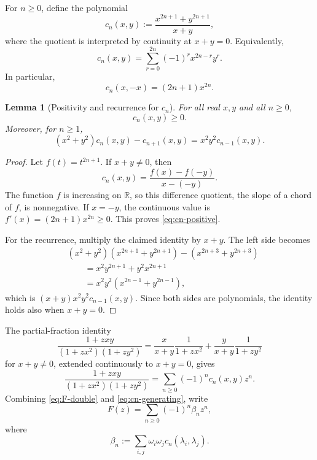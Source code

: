 \documentclass[11pt]{article}
\newtheorem{lemma}[theorem]{Lemma}
\newcommand{\R}{\mathbb{R}}
\begin{document}
For $n\ge0$, define the polynomial
\begin{equation}
  c_n(x,y)
  :=
  \frac{x^{2n+1}+y^{2n+1}}{x+y},
  \label{eq:def-cn-quotient}
\end{equation}
where the quotient is interpreted by continuity at $x+y=0$.  Equivalently,
\begin{equation}
  c_n(x,y)
  =
  \sum_{r=0}^{2n}(-1)^r x^{2n-r}y^r.
  \label{eq:def-cn-polynomial}
\end{equation}
In particular,
\[
  c_n(x,-x)=(2n+1)x^{2n}.
\]

\begin{lemma}[Positivity and recurrence for $c_n$]
\label{lem:cn}
For all real $x,y$ and all $n\ge0$,
\begin{equation}
  c_n(x,y)\ge0.
  \label{eq:cn-positive}
\end{equation}
Moreover, for $n\ge1$,
\begin{equation}
  (x^2+y^2)c_n(x,y)-c_{n+1}(x,y)
  =x^2y^2c_{n-1}(x,y).
  \label{eq:cn-recurrence}
\end{equation}
\end{lemma}

\begin{proof}
Let $f(t)=t^{2n+1}$.  If $x+y\ne0$, then
\[
  c_n(x,y)=\frac{f(x)-f(-y)}{x-(-y)}.
\]
The function $f$ is increasing on $\R$, so this difference quotient,
the slope of a chord of $f$, is nonnegative.  If $x=-y$, the continuous value is
$f'(x)=(2n+1)x^{2n}\ge0$.  This proves
\eqref{eq:cn-positive}.

For the recurrence, multiply the claimed identity by $x+y$.  The left
side becomes
\begin{align*}
 &(x^2+y^2)(x^{2n+1}+y^{2n+1})
 -(x^{2n+3}+y^{2n+3})\\
 &\qquad
 =x^2y^{2n+1}+y^2x^{2n+1}\\
 &\qquad
 =x^2y^2(x^{2n-1}+y^{2n-1}),
\end{align*}
which is $(x+y)x^2y^2c_{n-1}(x,y)$.  Since both sides are polynomials,
the identity holds also when $x+y=0$.
\end{proof}

The partial-fraction identity
\begin{equation}
  \frac{1+zxy}{(1+zx^2)(1+zy^2)}
  =
  \frac{x}{x+y}\frac1{1+zx^2}
  +
  \frac{y}{x+y}\frac1{1+zy^2}
  \label{eq:partial-fraction}
\end{equation}
for $x+y\ne0$, extended continuously to $x+y=0$, gives
\begin{equation}
  \frac{1+zxy}{(1+zx^2)(1+zy^2)}
  =
  \sum_{n\ge0}(-1)^n c_n(x,y)z^n.
  \label{eq:cn-generating}
\end{equation}
Combining \eqref{eq:F-double} and \eqref{eq:cn-generating}, write
\begin{equation}
  F(z)=\sum_{n\ge0}(-1)^n\beta_nz^n,
  \label{eq:F-beta}
\end{equation}
where
\begin{equation}
  \beta_n:=\sum_{i,j}\omega_i\omega_j
  c_n(\lambda_i,\lambda_j).
  \label{eq:def-beta}
\end{equation}
\end{document}
